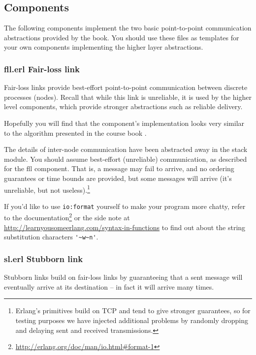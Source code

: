 \documentclass[a4paper]{article}
\begin{document}
\subsection{Components} %
\label{sub:components}

The following components implement the two basic point-to-point communication
abstractions provided by the book. You should use these files as templates
for your own components implementing the higher layer abstractions.

\subsubsection{fll.erl Fair-loss link} %
\label{ssub:fll_erl}

Fair-loss links provide best-effort point-to-point communication between
discrete processes (nodes). Recall that while this link is unreliable, it is
used by the higher level components, which provide stronger abstractions such
as reliable delivery.

Hopefully you will find that the component's implementation looks very
similar to the algorithm presented in the course book \cite{cachin2011}.

The details of inter-node communication have been abstracted away in the stack
module. You should assume best-effort (unreliable) communication, as described
for the fll component. That is, a message may fail to arrive, and no ordering
guarantees or time bounds are provided, but some messages will arrive (it's
unreliable, but not useless).\footnote{Erlang's primitives build on TCP and
tend to give stronger guarantees, so for testing purposes we have injected
additional problems by randomly dropping and delaying sent and received transmissions.}

If you'd like to use \lstinline!io:format! yourself to make your program more
chatty, refer to the
documentation\footnote{\url{http://erlang.org/doc/man/io.html\#format-1}} or
the side note at \url{http://learnyousomeerlang.com/syntax-in-functions} to
find out about the string substitution characters \lstinline!'~w~n'!.


\subsubsection{sl.erl Stubborn link} %
\label{ssub:sl_erl_stubborn_link}

Stubborn links build on fair-loss links by guaranteeing that a sent message
will eventually arrive at its destination – in fact it will arrive many times.
\end{document}
